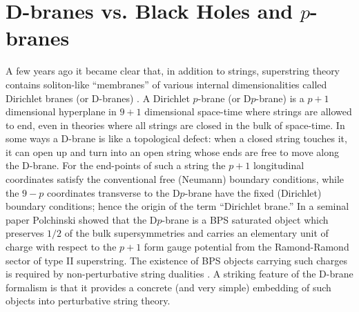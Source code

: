 \section{D-branes vs. Black Holes and $p$-branes}

A few years ago it became clear that, 
in addition to strings, superstring theory
contains soliton-like ``membranes'' of various internal dimensionalities
called Dirichlet branes (or D-branes) \cite{Dnotes}.
A Dirichlet $p$-brane (or D$p$-brane) is a $p+1$ dimensional hyperplane
in $9+1$ dimensional space-time where strings are allowed to end,
even in theories where all strings are closed in the bulk of space-time.
In some ways a D-brane is like a topological defect: when a closed string
touches it, it can open up and turn into an open string whose
ends are free to move along the D-brane. For the end-points of such a string
the $p+1$ longitudinal coordinates satisfy the conventional free (Neumann)
boundary conditions, while the $9-p$ coordinates transverse to
the D$p$-brane have the fixed (Dirichlet) boundary conditions; hence
the origin of the term ``Dirichlet brane.'' 
In a seminal paper \cite{brane} Polchinski
showed that the D$p$-brane is a BPS saturated object which preserves
$1/2$ of the bulk supersymmetries and carries an elementary unit
of charge with respect to the $p+1$ form gauge potential from the
Ramond-Ramond sector of type II superstring. The existence of BPS
objects carrying such charges is required by non-perturbative string
dualities \cite{HullT}. A striking feature of the D-brane formalism 
is that it provides a
concrete (and very simple) embedding of such objects into perturbative
string theory.

